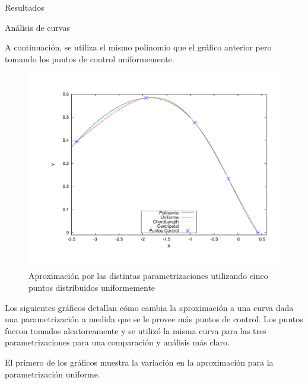 \begin{section}{Resultados}
\begin{subsection}{Análisis de curvas}
		\VSP
		
		A continuación, se utiliza el mismo polinomio que el gráfico anterior pero tomando los puntos de control uniformemente.
		
		\begin{figure}[H]
		  \centering
			\includegraphics[width=14cm]{graficos/5p_u.pdf}
		  \caption{Aproximación por las distintas parametrizaciones utilizando cinco puntos distribuidos uniformemente}
		  \label{fig:5p_u}
		\end{figure}
		
		\VSP

		Los siguientes gráficos detallan cómo cambia la aproximación a una curva dada una parametrización a medida que se le provee más puntos de control. 
		Los puntos fueron tomados aleatoreamente y se utilizó la misma curva para las tres parametrizaciones para una comparación y análisis más claro.
			
		El primero de los gráficos muestra la variación en la aproximación para la parametrización uniforme.
			

\end{subsection}
\end{section}
